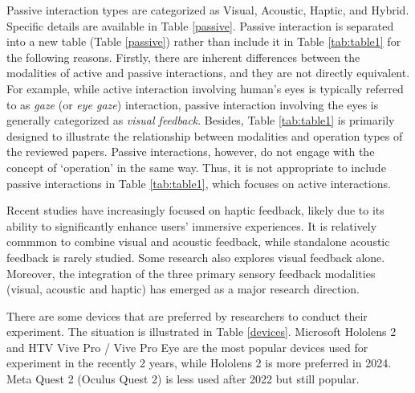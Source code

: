\documentclass[review]{fcs}
\newcommand{\revise}[2]{\textcolor[rgb]{0,0,0}{#2}}
\begin{document}
Passive interaction types are categorized as Visual, Acoustic, Haptic, and Hybrid. Specific details are available in Table \ref{passive}. 
\revise{}{Passive interaction is separated into a new table (Table \ref{passive}) rather than include it in Table \ref{tab:table1} for the following reasons.
Firstly, there are inherent differences between the modalities of active and passive interactions, and they are not directly equivalent. For example, while active interaction involving human's eyes is typically referred to as \textit{gaze} (or \textit{eye gaze}) interaction, passive interaction involving the eyes is generally categorized as \textit{visual feedback}. 
Besides, Table \ref{tab:table1} is primarily designed to illustrate the relationship between modalities and operation types of the reviewed papers. Passive interactions, however, do not engage with the concept of `operation' in the same way. Thus, it is not appropriate to include passive interactions in Table \ref{tab:table1}, which focuses on active interactions.
}

\revise{}{Recent studies have increasingly focused on haptic feedback}, likely due to its ability to significantly enhance users' immersive experiences. \revise{Combined Visual and Acoustic feedback is relatively common,}{It is relatively commmon to combine visual and acoustic feedback,} while standalone acoustic feedback is rarely studied. Some research also explores visual feedback alone. Moreover, the integration of the three primary sensory feedback modalities (visual, acoustic and haptic) has emerged as a major research direction.

%


\revise{}{There are some devices that are preferred by researchers to conduct their experiment. The situation is illustrated in Table \ref{devices}. Microsoft Hololens 2 and HTV Vive Pro / Vive Pro Eye are the most popular devices used for experiment in the recently 2 years, while Hololens 2 is more preferred in 2024. Meta Quest 2 (Oculus Quest 2) is less used after 2022 but still popular.}
\end{document}
